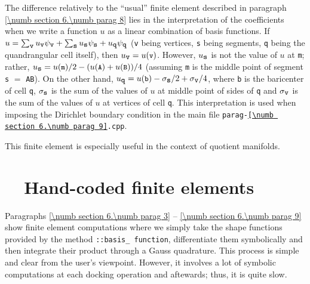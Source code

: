 The difference relatively to the ``usual'' finite element described in paragraph
\ref{\numb section 6.\numb parag 8} lies in the interpretation
of the coefficients when we write a function $u$ as a linear combination of basis functions.
If $ u = \sum_{\mbox{\small\tt v}} u_{\mbox{\small\tt v}} \psi_{\mbox{\small\tt v}} +
\sum_{\mbox{\small\tt s}} u_{\mbox{\small\tt s}} \psi_{\mbox{\small\tt s}} +
u_{\mbox{\small\tt q}} \psi_{\mbox{\small\tt q}} $
({\small\tt v} being vertices, {\small\tt s} being segments, {\small\tt q} being the quandrangular
cell itself), then $ u_{\mbox{\small\tt v}} = u(\mbox{\small\tt v}) $.
However, $ u_{\mbox{\small\tt s}} $ is not the value of $u$ at {\small\tt m};
rather, $ u_{\mbox{\small\tt s}} = u(\mbox{\small\tt m}) / 2 - ( u(\mbox{\small\tt A}) +
u(\mbox{\small\tt B}) ) / 4 $ (assuming {\small\tt m} is the middle point of segment
{\small\tt s} $=$ {\small\tt AB}).
On the other hand, $ u_{\mbox{\small\tt q}} = u(\mbox{\small\tt b}) -
\sigma_{\mbox{\small\tt s}}/2 + \sigma_{\mbox{\small\tt v}}/4 $,
where {\small\tt b} is the baricenter of cell {\small\tt q},
$ \sigma_{\mbox{\small\tt s}} $ is the sum of the values of $u$ at middle point of sides of
{\small\tt q} and $ \sigma_{\mbox{\small\tt v}} $ is the sum of the values of $u$ at vertices
of cell {\small\tt q}.
This interpretation is used when imposing the Dirichlet boundary condition in the main file
{\small\tt parag-\ref{\numb section 6.\numb parag 9}.cpp}.

This finite element is especially useful in the context of quotient manifolds.


\section{~~Hand-coded finite elements}\label{\numb section 6.\numb parag 10}

Paragraphs \ref{\numb section 6.\numb parag 3} -- \ref{\numb section 6.\numb parag 9}
show finite element computations where we simply take the shape functions provided by
the method {\small\tt{}::basis\_\,function}, differentiate them
symbolically and then integrate their product through a Gauss quadrature.
This process is simple and clear from the user's viewpoint.
However, it involves a lot of symbolic computations at each docking operation and aftewards;
thus, it is quite slow.

